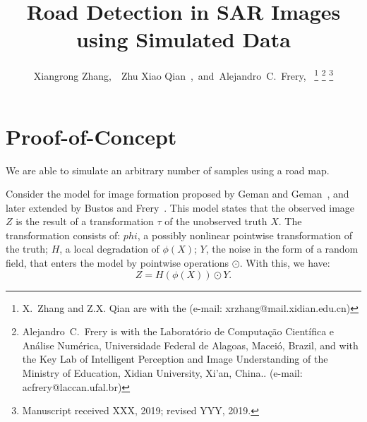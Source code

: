\documentclass[journal]{IEEEtran}
\begin{document}
	
\title{Road Detection in SAR Images using Simulated Data}
	
\author{Xiangrong Zhang,~~Zhu Xiao Qian~,~and~Alejandro~C.~Frery,~%
	\thanks{X.~Zhang and Z.X. Qian are with the  (e-mail: xrzhang@mail.xidian.edu.cn)}%
	\thanks{Alejandro~C.~Frery is with the Laborat\'orio de Computa\c c\~ao Cient\'ifica e An\'alise Num\'erica, Universidade Federal de Alagoas, Macei\'o, Brazil, and with the Key Lab of Intelligent Perception and Image Understanding of the Ministry of Education, Xidian University, Xi'an, China.. (e-mail: acfrery@laccan.ufal.br)}%
	\thanks{Manuscript received XXX, 2019; revised YYY, 2019.}
	}


\maketitle

\IEEEdisplaynontitleabstractindextext
\IEEEpeerreviewmaketitle

\section{Proof-of-Concept}\label{sec:SamplingMethodology}

We are able to simulate an arbitrary number of samples using a road map.

Consider the model for image formation proposed by Geman and Geman~\cite{geman84}, and later extended by Bustos and Frery~\cite{buseucam92}.
This model states that the observed image $Z$ is the result of a transformation $\tau$ of the unobserved truth $X$.
The transformation consists of:
$phi$, a possibly nonlinear pointwise transformation of the truth;
$H$, a local degradation of $\phi(X)$;
$Y$, the noise in the form of a random field, that enters the model by pointwise operations $\odot$.
With this, we have:
\begin{equation}
Z = H(\phi(X)) \odot Y.
\label{eq:GemanGeman}
\end{equation}
\end{document}
